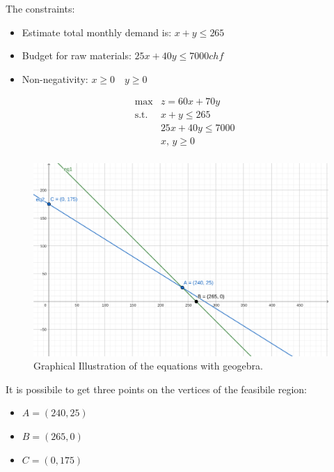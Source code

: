 \documentclass[unicode,11pt,a4paper,oneside,numbers=endperiod,openany]{scrartcl}
\begin{document}
The constraints:
\begin{itemize}
 \item Estimate total monthly demand is: $x+y \leq 265$
 \item Budget for raw materials: $25x + 40y \leq 7000 chf$
 \item Non-negativity: $x \geq 0 \quad y \geq 0$
\end{itemize}

\begin{equation*}
		\begin{aligned}
		& \text{max}  &  z=60x + 70y\\
		& \text{s.t.} &  x+y \leq 265\\
		& &   25x+40y \leq 7000 \\
		& &  x,\,y \geq0 \\
		\end{aligned}
\end{equation*}


\begin{figure}[H]
    \centering
    \includegraphics[trim=0cm 10cm 10cm 2cm, clip, width=\textwidth]{geogebra-export2.png}
    \caption{Graphical Illustration of the equations with geogebra.}
    \label{fig:img2}
\end{figure}
It is possibile to get three points on the vertices of the feasibile region: \newline
\begin{itemize}
 \item $A = (240, 25)$
 \item $B = (265, 0)$
 \item $C = (0, 175)$
\end{itemize}
\end{document}
